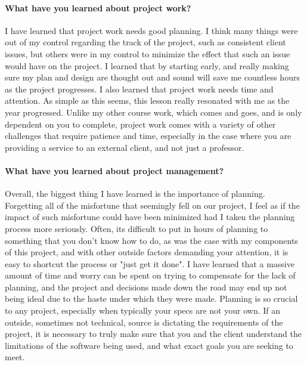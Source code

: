 \documentclass[onecolumn, draftclsnofoot,10pt, compsoc]{IEEEtran}
\begin{document}
\paragraph{What have you learned about project work?}
I have learned that project work needs good planning. I think many things were out of my control regarding the track of the project, such as consistent client issues, but others were in my control to minimize the effect that such an issue would have on the project. I learned that by starting early, and really making sure my plan and design are thought out and sound will save me countless hours as the project progresses. I also learned that project work needs time and attention. As simple as this seems, this lesson really resonated with me as the year progressed. Unlike my other course work, which comes and goes, and is only dependent on you to complete, project work comes with a variety of other challenges that require patience and time, especially in the case where you are providing a service to an external client, and not just a professor.
\paragraph{What have you learned about project management?}
Overall, the biggest thing I have learned is the importance of planning. Forgetting all of the misfortune that seemingly fell on our project, I feel as if the impact of such misfortune could have been minimized had I taken the planning process more seriously. Often, its difficult to put in hours of planning to something that you don't know how to do, as was the case with my components of this project, and with other outside factors demanding your attention, it is easy to shortcut the process or "just get it done". I have learned that a massive amount of time and worry can be spent on trying to compensate for the lack of planning, and the project and decisions made down the road may end up not being ideal due to the haste under which they were made. Planning is so crucial to any project, especially when typically your specs are not your own. If an outside, sometimes not technical, source is dictating the requirements of the project, it is necessary to truly make sure that you and the client understand the limitations of the software being used, and what exact goals you are seeking to meet.
\end{document}

